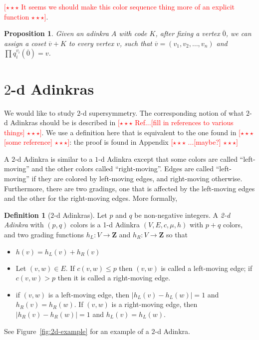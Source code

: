 \documentclass[12pt,twoside,singlespace]{article}
\numberwithin{equation}{section}
\newtheorem{prop}[equation]{Proposition}
\theoremstyle{definition}
\newtheorem{definition}[equation]{Definition}
\newcommand{\ZZ}{\mathbf{Z}}
\newcommand{\com}[1]{\textcolor{red}{$[\star \star \star$ #1 $\star \star \star]$}}
\begin{document}
\com{It seems we should make this color sequence thing more of an explicit function}.

\begin{prop}
Given an adinkra $A$ with code $K$, after fixing a vertex $\overline{0}$, we can assign a coset $\overline{v}+K$ to every vertex $v$, such that $\overline{v} = (v_1, v_2, \ldots, v_n)$ and $\prod q_i^{v_i} (\overline{0}) = v$.
\end{prop}


\section{$2$-d Adinkras}
We would like to study $2$-d supersymmetry. The corresponding notion of what $2$-d Adinkras should be is described in \com{Ref...[fill in references to various things]}.  We use a definition here that is equivalent to the one found in \com{[some reference]}: the proof is found in Appendix \com{...[maybe?]}

A $2$-d Adinkra is similar to a $1$-d Adinkra except that some colors are called ``left-moving'' and the other colors called ``right-moving''.  Edges are called ``left-moving'' if they are colored by left-moving edges, and right-moving otherwise.  Furthermore, there are two gradings, one that is affected by the left-moving edges and the other for the right-moving edges. More formally,
\begin{definition}[$2$-d Adinkras]
Let $p$ and $q$ be non-negative integers. A \emph{2-d Adinkra} with $(p,q)$ colors is a 1-d Adinkra $(V,E,c,\mu,h)$ with $p+q$ colors, and two grading functions $h_L:V\to \ZZ$ and $h_R:V\to \ZZ$ so that
\begin{itemize}
\item $h(v)=h_L(v)+h_R(v)$
\item Let $(v,w)\in E$.  If $c(v,w)\le p$ then $(v,w)$ is called a left-moving edge; if $c(v,w)>p$ then it is called a right-moving edge.
\item if $(v,w)$ is a left-moving edge, then $|h_L(v)-h_L(w)|=1$ and $h_R(v)=h_R(w)$.  If $(v,w)$ is a right-moving edge, then $|h_R(v)-h_R(w)|=1$ and $h_L(v)=h_L(w)$.
\end{itemize}

See Figure~\ref{fig:2d-example} for an example of a $2$-d Adinkra.
\end{definition}
\end{document}
